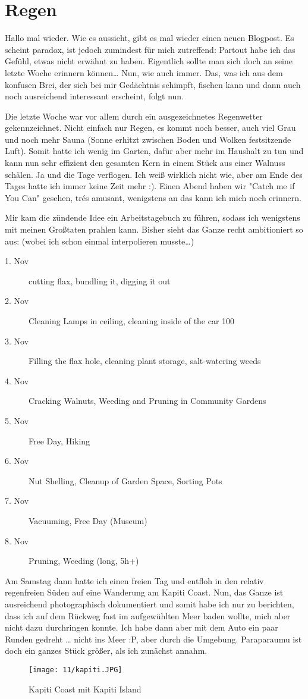 \chapter{Regen}

Hallo mal wieder. Wie es aussieht, gibt es mal wieder einen neuen
Blogpost. Es scheint paradox, ist jedoch zumindest für mich zutreffend:
Partout habe ich das Gefühl, etwas nicht erwähnt zu haben. Eigentlich
sollte man sich doch an seine letzte Woche erinnern können\ldots{} Nun,
wie auch immer. Das, was ich aus dem konfusen Brei, der sich bei mir
Gedächtnis schimpft, fischen kann und dann auch noch ausreichend
interessant erscheint, folgt nun.

Die letzte Woche war vor allem durch ein ausgezeichnetes Regenwetter
gekennzeichnet. Nicht einfach nur Regen, es kommt noch besser, auch viel
Grau und noch mehr Sauna (Sonne erhitzt zwischen Boden und Wolken
festsitzende Luft). Somit hatte ich wenig im Garten, dafür aber mehr im
Haushalt zu tun und kann nun sehr effizient den gesamten Kern in einem
Stück aus einer Walnuss schälen. Ja und die Tage verflogen. Ich weiß
wirklich nicht wie, aber am Ende des Tages hatte ich immer keine Zeit
mehr :). Einen Abend haben wir "Catch me if You Can" gesehen, trés
amusant, wenigstens an das kann ich mich noch erinnern.

Mir kam die zündende Idee ein Arbeitstagebuch zu führen, sodass ich
wenigstens mit meinen Großtaten prahlen kann. Bisher sieht das Ganze
recht ambitioniert so aus: (wobei ich schon einmal interpolieren
musste\ldots)

\begin{description}
\item[1. Nov] cutting flax, bundling it, digging it out
\item[2. Nov] Cleaning Lamps in ceiling, cleaning inside of the car 100%
\item[3. Nov] Filling the flax hole, cleaning plant storage, salt-watering weeds
\item[4. Nov] Cracking Walnuts, Weeding and Pruning in Community Gardens
\item[5. Nov] Free Day, Hiking
\item[6. Nov] Nut Shelling, Cleanup of Garden Space, Sorting Pots
\item[7. Nov] Vacuuming, Free Day (Museum)
\item[8. Nov] Pruning, Weeding (long, 5h+)
\end{description}

Am Samstag dann hatte ich einen freien Tag und entfloh in den relativ
regenfreien Süden auf eine Wanderung am Kapiti Coast. Nun, das Ganze ist
ausreichend photographisch dokumentiert und somit habe ich nur zu
berichten, dass ich auf dem Rückweg fast im aufgewühlten Meer baden
wollte, mich aber nicht dazu durchringen konnte. Ich habe dann aber mit
dem Auto ein paar Runden gedreht \ldots{} nicht ins Meer :P, aber durch
die Umgebung. Paraparaumu ist doch ein ganzes Stück größer, als ich
zunächst annahm.
\begin{figure}[h]
  \centering
  \texttt{[image: 11/kapiti.JPG]}
  \caption*{Kapiti Coast mit Kapiti Island}
\end{figure}

